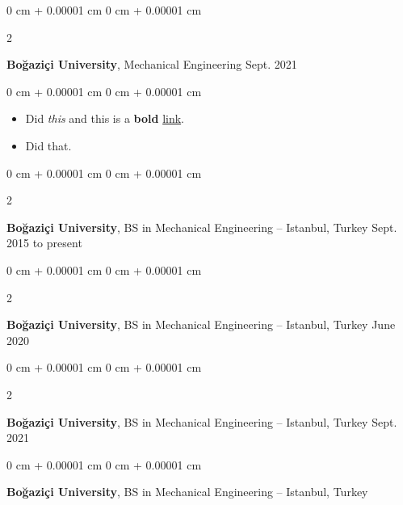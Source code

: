 \documentclass[10pt, letterpaper]{article}
\newenvironment{highlights}{
    \begin{itemize}[
        topsep=0.10 cm,
        parsep=0.10 cm,
        partopsep=0pt,
        itemsep=0pt,
        leftmargin=0 cm + 10pt
    ]
}{
    \end{itemize}
        
    \vspace{-0.10cm}
} %
\newenvironment{onecolentry}{
    \begin{adjustwidth}{
        0 cm + 0.00001 cm
    }{
        0 cm + 0.00001 cm
    }
}{
    \end{adjustwidth}
} %
\newenvironment{twocolentry}[2][]{
    \onecolentry
    \def\secondColumn{#2}
    \setcolumnwidth{\fill, 4.1 cm}
    \begin{paracol}{2}
}{
    \switchcolumn \raggedleft \secondColumn
    \end{paracol}
    \endonecolentry
} %
\begin{document}
        \begin{twocolentry}{
            Sept. 2021
        }
            \textbf{Boğaziçi University}, Mechanical Engineering\end{twocolentry}

        \vspace{0.10 cm}
        \begin{onecolentry}
            \begin{highlights}
                \item Did \textit{this} and this is a \textbf{bold} \href{https://example.com}{link}.
                \item Did that.
            \end{highlights}
        \end{onecolentry}


        \vspace{0.15 cm}

        \begin{twocolentry}{
            Sept. 2015 to present
        }
            \textbf{Boğaziçi University}, BS in Mechanical Engineering -- Istanbul, Turkey\end{twocolentry}

        \vspace{0.10 cm}


        \vspace{0.15 cm}

        \begin{twocolentry}{
            June 2020
        }
            \textbf{Boğaziçi University}, BS in Mechanical Engineering -- Istanbul, Turkey\end{twocolentry}

        \vspace{0.10 cm}


        \vspace{0.15 cm}

        \begin{twocolentry}{
            Sept. 2021
        }
            \textbf{Boğaziçi University}, BS in Mechanical Engineering -- Istanbul, Turkey\end{twocolentry}

        \vspace{0.10 cm}


        \vspace{0.15 cm}

        \begin{onecolentry}
            \textbf{Boğaziçi University}, BS in Mechanical Engineering -- Istanbul, Turkey\end{onecolentry}
\end{document}

